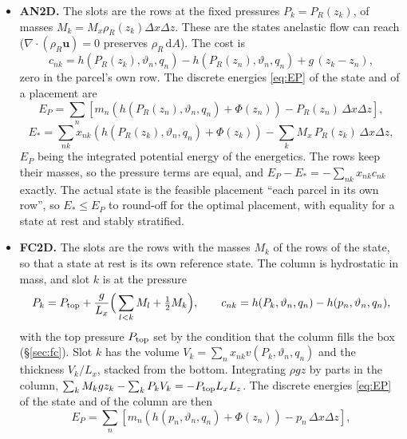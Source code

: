 \documentclass[11pt,a4paper]{article}
\newcommand{\vt}{\vartheta}
\newcommand{\Ptop}{P_{\rm top}}
\begin{document}
\begin{itemize}
  \item \textbf{AN2D.} The slots are the rows at the fixed pressures $P_k=P_R(z_k)$, of masses $M_k=M_x\rho_R(z_k)\Delta x\Delta z$.
        These are the states anelastic flow can reach ($\nabla\cdot(\rho_R\mathbf u)=0$ preserves $\rho_R\,\mathrm{d}A$). The
        cost is
        \begin{equation}
          c_{nk}=h(P_R(z_k),\vt_n,q_n)-h(P_R(z_n),\vt_n,q_n)+g\,(z_k-z_n),
          \label{eq:an-cost}
        \end{equation}
        zero in the parcel's own row. The discrete energies \eqref{eq:EP} of the state and of a placement are
        \begin{equation}
          E_P=\sum_n\left[m_n\left(h(P_R(z_n),\vt_n,q_n)+\Phi(z_n)\right)-P_R(z_n)\,\Delta x\Delta z\right],
        \end{equation}
        \begin{equation}
          E_*=\sum_{nk}x_{nk}\left(h(P_R(z_k),\vt_n,q_n)+\Phi(z_k)\right)-\sum_kM_x\,P_R(z_k)\,\Delta x\Delta z ,
        \end{equation}
        $E_P$ being the integrated potential energy of the energetics. The rows keep their masses, so the pressure terms
        are equal, and $E_P-E_*=-\sum_{nk}x_{nk}c_{nk}$ exactly. The actual state is the feasible placement ``each
        parcel in its own row'', so $E_*\le E_P$ to round-off for the optimal placement, with equality for a state at rest
        and stably stratified.
  \item \textbf{FC2D.} The slots are the rows with the masses $M_k$ of the rows of the state, so that a state at rest is its
        own reference state. The column is hydrostatic in mass, and slot $k$ is at the pressure
        \begin{equation}
          P_k=\Ptop+\frac{g}{L_x}\Big(\sum_{l<k}M_l+\tfrac12M_k\Big),\qquad c_{nk}=h(P_k,\vt_n,q_n)-h(p_n,\vt_n,q_n),
          \label{eq:fc-cost}
        \end{equation}
        with the top pressure $\Ptop$ set by the condition that the column fills the box (\S\ref{sec:fc}). Slot $k$ has the
        volume $V_k=\sum_nx_{nk}v(P_k,\vt_n,q_n)$ and the thickness $V_k/L_x$, stacked from the bottom. Integrating
        $\rho gz$ by parts in the column, $\sum_kM_kgz_k-\sum_kP_kV_k=-\Ptop L_xL_z$. The discrete energies \eqref{eq:EP}
        of the state and of the column are then
        \begin{equation}
          E_P=\sum_n\left[m_n\left(h(p_n,\vt_n,q_n)+\Phi(z_n)\right)-p_n\,\Delta x\Delta z\right],

\end{equation}
\end{itemize}
\end{document}
